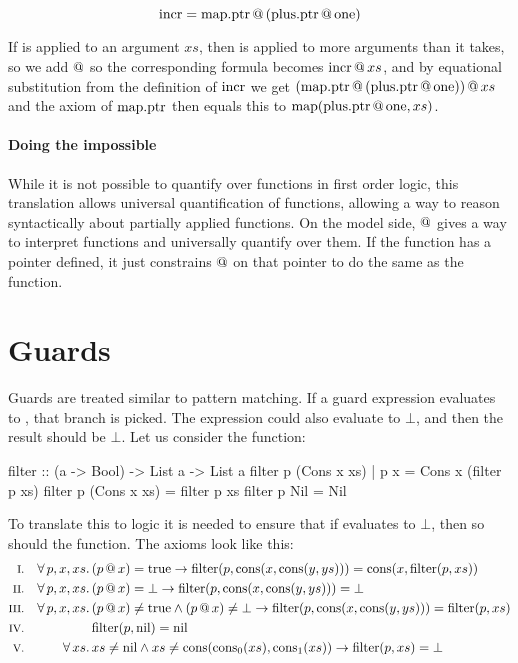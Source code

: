 \begin{equation*}
\mathrm{incr} = \mathrm{map.ptr} \, @ \, (\mathrm{plus.ptr} \, @ \, \mathrm{one})
\end{equation*}

If  is applied to an argument $xs$, then  is applied
to more arguments than it takes, so we add $@$ so the
corresponding formula becomes $\mathrm{incr} \, @ \, xs$, and by equational
substitution from the definition of $\mathrm{incr}$ we get
$(\mathrm{map.ptr} \, @ \, (\mathrm{plus.ptr} \, @ \, \mathrm{one})) \, @ \, xs$ and
the axiom of $\mathrm{map.ptr}$ then equals this to
$\mathrm{map}(\mathrm{plus.ptr} \, @ \, \mathrm{one},xs)$.

\paragraph{Doing the impossible}
While it is not possible to quantify over functions in first order
logic, this translation allows universal quantification of functions,
allowing a way to reason syntactically about partially applied
functions. On the model side, $@$ gives a way to interpret
functions and universally quantify over them. If the function has a
pointer defined, it just constrains $@$ on that pointer to do the
same as the function.

\section{Guards}

Guards are treated similar to pattern matching. If a guard expression
evaluates to , that branch is picked. The expression could
also evaluate to $\bot$, and then the result should be $\bot$. Let us
consider the  function:

\begin{code}
filter :: (a -> Bool) -> List a -> List a
filter p (Cons x xs) | p x = Cons x (filter p xs)
filter p (Cons x xs)       = filter p xs
filter p Nil               = Nil
\end{code}


To translate this to logic it is needed to ensure that if 
evaluates to $\bot$, then so should the function. The axioms look
like this:
\newcommand\filter[2]{\fn{filter}(#1,#2)}
\begin{align*}
\rom{1} && \faaa{p}{x}{xs} & (\app{p}{x}) = \fn{true}                                  \rightarrow \filter{p}{\cons{x}{\cons{y}{ys}}} = \cons{x}{\filter{p}{xs}} \\
\rom{2} && \faaa{p}{x}{xs} & (\app{p}{x}) = \bot                                       \rightarrow \filter{p}{\cons{x}{\cons{y}{ys}}} = \bot \\
\rom{3} && \faaa{p}{x}{xs} & (\app{p}{x}) \neq \fn{true} \wedge (\app{p}{x}) \neq \bot \rightarrow \filter{p}{\cons{x}{\cons{y}{ys}}} = \filter{p}{xs} \\
\rom{4} &&                 & \filter{p}{\fn{nil}} = \fn{nil} \\
\rom{5} && \fa{xs}         & xs \neq \fn{nil} \wedge xs \neq \uncons{xs} \rightarrow \filter{p}{xs} = \bot
\end{align*}

